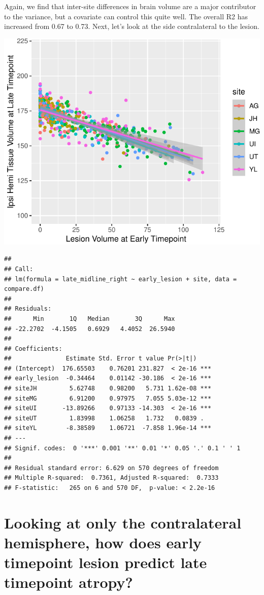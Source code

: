 \documentclass[
]{article}
\begin{document}
Again, we find that inter-site differences in brain volume are a major
contributor to the variance, but a covariate can control this quite
well. The overall R2 has increased from 0.67 to 0.73. Next, let's look
at the side contralateral to the lesion.

\begin{center}\includegraphics{paper_files/figure-latex/plot_harm_ipsi-1} \end{center}

\begin{verbatim}
## 
## Call:
## lm(formula = late_midline_right ~ early_lesion + site, data = compare.df)
## 
## Residuals:
##      Min       1Q   Median       3Q      Max 
## -22.2702  -4.1505   0.6929   4.4052  26.5940 
## 
## Coefficients:
##               Estimate Std. Error t value Pr(>|t|)    
## (Intercept)  176.65503    0.76201 231.827  < 2e-16 ***
## early_lesion  -0.34464    0.01142 -30.186  < 2e-16 ***
## siteJH         5.62748    0.98200   5.731 1.62e-08 ***
## siteMG         6.91200    0.97975   7.055 5.03e-12 ***
## siteUI       -13.89266    0.97133 -14.303  < 2e-16 ***
## siteUT         1.83998    1.06258   1.732   0.0839 .  
## siteYL        -8.38589    1.06721  -7.858 1.96e-14 ***
## ---
## Signif. codes:  0 '***' 0.001 '**' 0.01 '*' 0.05 '.' 0.1 ' ' 1
## 
## Residual standard error: 6.629 on 570 degrees of freedom
## Multiple R-squared:  0.7361, Adjusted R-squared:  0.7333 
## F-statistic:   265 on 6 and 570 DF,  p-value: < 2.2e-16
\end{verbatim}

\hypertarget{looking-at-only-the-contralateral-hemisphere-how-does-early-timepoint-lesion-predict-late-timepoint-atropy}{%
\section{Looking at only the contralateral hemisphere, how does early
timepoint lesion predict late timepoint
atropy?}\label{looking-at-only-the-contralateral-hemisphere-how-does-early-timepoint-lesion-predict-late-timepoint-atropy}}
\end{document}
